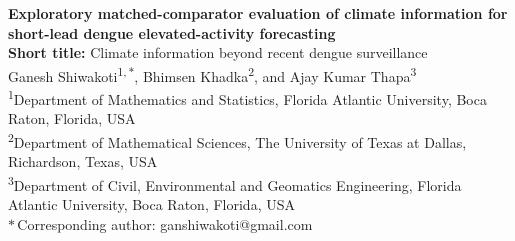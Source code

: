 \documentclass[11pt,a4paper]{article}
\begin{document}
\thispagestyle{fancy}
\begin{center}
{\Large \textbf{Exploratory matched-comparator evaluation of climate information for short-lead dengue elevated-activity forecasting}}\\[1.0em]

{\normalsize \textbf{Short title:} Climate information beyond recent dengue surveillance}\\[1.2em]

Ganesh Shiwakoti\textsuperscript{1,\,$\ast$}, Bhimsen Khadka\textsuperscript{2}, and Ajay Kumar Thapa\textsuperscript{3}\\[0.6em]

\footnotesize
\textsuperscript{1}Department of Mathematics and Statistics, Florida Atlantic University, Boca Raton, Florida, USA\\
\textsuperscript{2}Department of Mathematical Sciences, The University of Texas at Dallas, Richardson, Texas, USA\\
\textsuperscript{3}Department of Civil, Environmental and Geomatics Engineering, Florida Atlantic University, Boca Raton, Florida, USA\\[0.3em]
$\ast$\,Corresponding author: ganshiwakoti@gmail.com
\end{center}

\newpage
\end{document}
